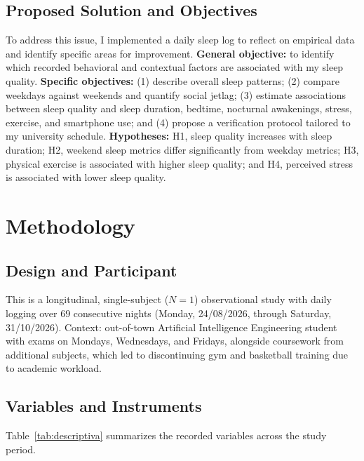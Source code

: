 \documentclass[conference]{IEEEtran}
\begin{document}
\subsection{Proposed Solution and Objectives}
To address this issue, I implemented a daily sleep log to reflect on empirical data and identify specific areas for improvement. \textbf{General objective:} to identify which recorded behavioral and contextual factors are associated with my sleep quality. \textbf{Specific objectives:} (1) describe overall sleep patterns; (2) compare weekdays against weekends and quantify social jetlag; (3) estimate associations between sleep quality and sleep duration, bedtime, nocturnal awakenings, stress, exercise, and smartphone use; and (4) propose a verification protocol tailored to my university schedule. \textbf{Hypotheses:} H1, sleep quality increases with sleep duration; H2, weekend sleep metrics differ significantly from weekday metrics; H3, physical exercise is associated with higher sleep quality; and H4, perceived stress is associated with lower sleep quality.

\section{Methodology}

\subsection{Design and Participant}
This is a longitudinal, single-subject ($N=1$) observational study with daily logging over 69 consecutive nights (Monday, 24/08/2026, through Saturday, 31/10/2026). Context: out-of-town Artificial Intelligence Engineering student with exams on Mondays, Wednesdays, and Fridays, alongside coursework from additional subjects, which led to discontinuing gym and basketball training due to academic workload.

\subsection{Variables and Instruments}
Table~\ref{tab:descriptiva} summarizes the recorded variables across the study period.
\end{document}
